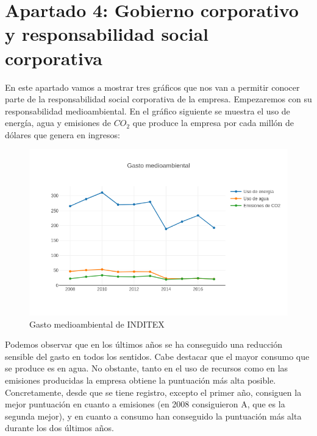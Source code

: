 \documentclass[11pt]{article}
\theoremstyle{plain}
\theoremstyle{definition}
\begin{document}
\section*{Apartado 4: Gobierno corporativo y responsabilidad social
  corporativa}

En este apartado vamos a mostrar tres gráficos que nos van a permitir
conocer parte de la responsabilidad social corporativa de la
empresa. Empezaremos con su responsabilidad medioambiental. En el
gráfico siguiente se muestra el uso de energía, agua y emisiones de
$CO_2$ que produce la empresa por cada millón de dólares que genera
en ingresos:

\begin{figure}[H]
  \centering \includegraphics[width=\textwidth]{graphs/environment.png}
  \caption{Gasto medioambiental de INDITEX}
\end{figure}

Podemos observar que en los últimos años se ha conseguido una reducción
sensible del gasto en todos los sentidos. Cabe destacar que el mayor consumo
que se produce es en agua. No obstante, tanto en el uso de recursos como
en las emisiones producidas la empresa obtiene la puntuación más alta
posible. Concretamente, desde que se tiene registro, excepto el primer
año, consiguen la mejor puntuación en cuanto a emisiones (en 2008 consiguieron
A, que es la segunda mejor), y en cuanto a consumo han conseguido la puntuación
más alta durante los dos últimos años. 
\printbibliography
\end{document}
